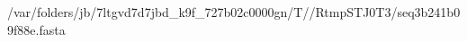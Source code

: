 \documentclass[10pt]{article}
\begin{document}
\begin{texshade}{/var/folders/jb/7ltgvd7d7jbd_k9f_727b02c0000gn/T//RtmpSTJ0T3/seq3b241b09f88e.fasta}
\hidelogoscale
{}
\showlegend
\end{texshade}
\end{document}
